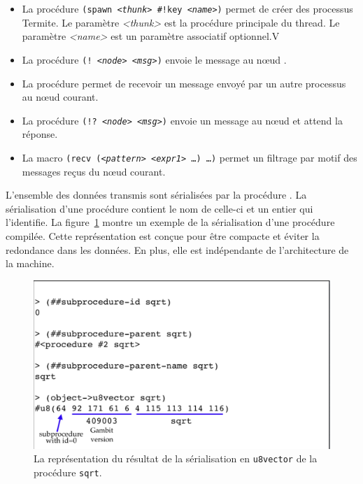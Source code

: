 \begin{itemize}
  \item La procédure \texttt{(spawn \textit{<thunk>} \#!key \textit{<name>})} permet de
    créer des processus Termite. Le paramètre \textit{<thunk>} est la procédure principale
    du thread. Le paramètre \textit{<name>} est un paramètre associatif optionnel.V

  \item La procédure \texttt{(! \textit{<node>} \textit{<msg>})} envoie le message
     au nœud .

  \item La procédure  permet de recevoir un message
    envoyé par un autre processus au nœud courant.

  \item La procédure \texttt{(!? \textit{<node>} \textit{<msg>})} envoie un message au
    nœud  et attend la réponse.

  \item La macro \texttt{(recv (\textit{<pattern>} \textit{<expr1>} \dots) \dots)}
    permet un filtrage par motif des messages reçus du nœud courant.

\end{itemize}

L'ensemble des données transmis sont sérialisées par la procédure .
La sérialisation d'une procédure contient le nom de celle-ci et un entier qui l'identifie.
La figure~\ref{fig:proc_serialization} montre un exemple de la sérialisation d'une procédure
compilée. Cette représentation est conçue pour être compacte et éviter la redondance dans les
données. En plus, elle est indépendante de l'architecture de la machine.
\begin{figure}[ht]
  \centering
  \includegraphics[scale=0.25]{figures/proc-serialization}
  \caption{La représentation du résultat de la sérialisation en \texttt{u8vector} de la procédure
    \texttt{sqrt}.}
  \label{fig:proc_serialization}
\end{figure}

